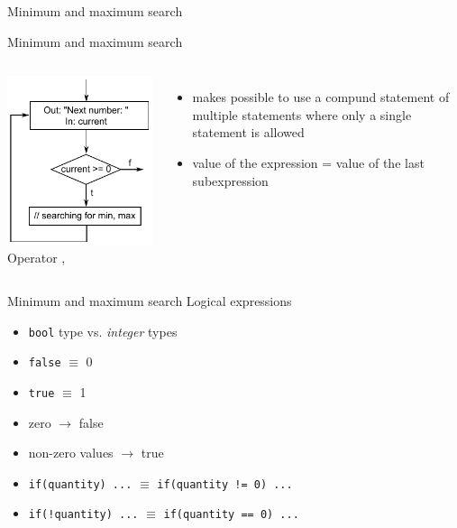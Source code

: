 \documentclass[usenames,dvipsnames,aspectratio=169]{beamer}
\newcommand{\kiemel}[1]{{\color{kiemelesszin}#1}}
\begin{document}
\begin{frame}{Minimum and maximum search}
  \begin{exampleblock}{}
    \scriptsize
    \vspace{-.3cm}
    
    \vspace{-.3cm}
  \end{exampleblock}
\end{frame}

\begin{frame}{Minimum and maximum search}
  \begin{columns}[c]
      \includegraphics{comma.pdf}
      Operator ,
      \begin{itemize}
        \item makes possible to use a compund statement of multiple statements where only a single statement is allowed
        \item value of the expression = value of the last subexpression
      \end{itemize}
  \end{columns}
\end{frame}

\begin{frame}{Minimum and maximum search}
  Logical expressions
  \begin{itemize}
    \item \texttt{bool} type vs. \emph{integer} types
    \item \texttt{false} \kiemel{$\equiv$} 0
    \item \texttt{true} \kiemel{$\equiv$} 1
    \item zero $\to$ false
    \item non-zero values $\to$ true
    \item \texttt{if(quantity) ...} \kiemel{$\equiv$} \texttt{if(quantity != 0) ...}
    \item \texttt{if(!quantity) ...} \kiemel{$\equiv$} \texttt{if(quantity == 0) ...}
  \end{itemize}
\end{frame}
\end{document}

